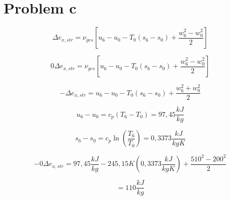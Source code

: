\section*{Problem c}

\[
\Delta e_{x, str} = \nu_{ges} \left[ u_6 - u_0 - T_0 (s_6 - s_0) + \frac{w_6^2 - w_0^2}{2} \right]
\]

\[
0 \Delta e_{x, str} = \nu_{ges} \left[ u_6 - u_0 - T_0 (s_6 - s_0) + \frac{w_6^2 - w_0^2}{2} \right]
\]

\[
-\Delta e_{x, str} = u_6 - u_0 - T_0 (s_6 - s_0) + \frac{w_6^2 + w_0^2}{2}
\]

\[
u_6 - u_0 = c_p (T_6 - T_0) = 97,45 \frac{kJ}{kg}
\]

\[
s_6 - s_0 = c_p \ln \left( \frac{T_6}{T_0} \right) = 0,3373 \frac{kJ}{kgK}
\]

\[
-0 \Delta e_{x, str} = 97,45 \frac{kJ}{kg} - 245,15 K \left( 0,3373 \frac{kJ}{kgK} \right) + \frac{510^2 - 200^2}{2}
\]

\[
= 110 \frac{kJ}{kg}
\]